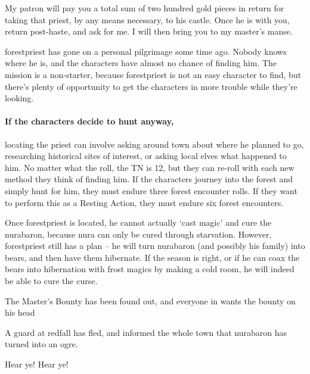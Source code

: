 \begin{multicols}{2}
\begin{speechtext}
  My patron will pay you a total sum of two hundred gold pieces in return for taking that priest, by any means necessary, to his castle.
  Once he is with you, return post-haste, and ask for me.
  I will then bring you to my master's manse.

\end{speechtext}

\Gls{forestpriest} has gone on a personal pilgrimage some time ago.
Nobody knows where he is, and the characters have almost no chance of finding him.
The mission is a non-starter, because \gls{forestpriest} is not an easy character to find, but there's plenty of opportunity to get the characters in more trouble while they're looking.

\paragraph{If the characters decide to hunt anyway,}
locating the priest can involve asking around \gls{town} about where he planned to go, researching historical sites of interest, or asking local elves what happened to him.
No matter what the roll, the TN is 12, but they can re-roll with each new method they think of finding him.
If the characters journey into the forest and simply hunt for him, they must endure three forest encounter rolls.
If they want to perform this as a Resting Action, they must endure six forest encounters.

Once \gls{forestpriest} is located, he cannot actually `cast magic' and cure the \gls{nurabaron}, because nura can only be cured through starvation.
However, \gls{forestpriest} still has a plan -- he will turn \gls{nurabaron} (and possibly his family) into bears, and then have them hibernate.
If the season is right, or if he can coax the bears into hibernation with frost magics by making a cold room, he will indeed be able to cure the curse.


{\N \N The Master's Bounty}%
{ has been found out, and everyone in  wants the bounty on his head}%

A guard at \gls{redfall} has fled, and informed the whole town that \gls{nurabaron} has turned into an ogre.

\begin{speechtext}

    Hear ye! Hear ye!


\end{speechtext}
\end{multicols}
